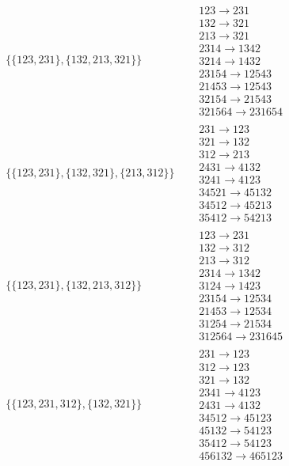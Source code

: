 \begin{tiny}
\begin{align}
\begin{matrix}
\end{matrix}
\\
\{\{123, 231\}, \{132, 213, 321\}\}
\quad
&
\begin{matrix}
123 \to 231\\132 \to 321\\213 \to 321\\2314 \to 1342\\3214 \to 1432\\23154 \to 12543\\21453 \to 12543\\32154 \to 21543\\321564 \to 231654
\end{matrix}
\\
\{\{123, 231\}, \{132, 321\}, \{213, 312\}\}
\quad
&
\begin{matrix}
231 \to 123\\321 \to 132\\312 \to 213\\2431 \to 4132\\3241 \to 4123\\34521 \to 45132\\34512 \to 45213\\35412 \to 54213
\end{matrix}
\\
\{\{123, 231\}, \{132, 213, 312\}\}
\quad
&
\begin{matrix}
123 \to 231\\132 \to 312\\213 \to 312\\2314 \to 1342\\3124 \to 1423\\23154 \to 12534\\21453 \to 12534\\31254 \to 21534\\312564 \to 231645
\end{matrix}
\\
\{\{123, 231, 312\}, \{132, 321\}\}
\quad
&
\begin{matrix}
231 \to 123\\312 \to 123\\321 \to 132\\2341 \to 4123\\2431 \to 4132\\34512 \to 45123\\45132 \to 54123\\35412 \to 54123\\456132 \to 465123
\end{matrix}

\end{align}
\end{tiny}
